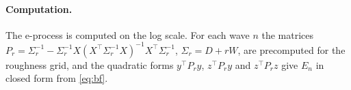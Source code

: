\documentclass[11pt]{article}
\theoremstyle{plain}
\theoremstyle{definition}
\begin{document}
\paragraph{Computation.} The e-process is computed on the log scale. For each wave $n$ the matrices $P_{r}=\Sigma_r^{-1}-\Sigma_r^{-1}X(X^\top\Sigma_r^{-1}X)^{-1}X^\top\Sigma_r^{-1}$, $\Sigma_r=D+rW$, are precomputed for the roughness grid, and the quadratic forms $y^\top P_{r}y$, $z^\top P_{r}y$ and $z^\top P_rz$ give $E_n$ in closed form from \eqref{eq:bf}.
\end{document}
